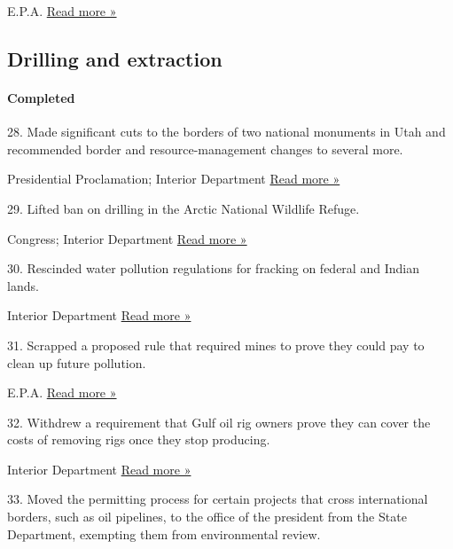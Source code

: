  E.P.A. \textbar{}
\href{https://www.agriculture.com/news/business/epa-proposal-would-shrink-buffer-zones-around-farm-pesticides}{Read
more »}

\hypertarget{drilling-and-extraction}{%
\subsection{Drilling and extraction}\label{drilling-and-extraction}}

\hypertarget{completed-1}{%
\paragraph{Completed}\label{completed-1}}

28. Made significant cuts to the borders of two national monuments in
Utah and recommended border and resource-management changes to several
more.

 Presidential Proclamation; Interior Department \textbar{}
\href{https://www.nytimes3xbfgragh.onion/2017/12/04/us/trump-bears-ears.html}{Read
more »}

29. Lifted ban on drilling in the Arctic National Wildlife Refuge.

 Congress; Interior Department \textbar{}
\href{https://www.nytimes3xbfgragh.onion/2019/08/21/us/oil-drilling-arctic.html}{Read
more »}

30. Rescinded water pollution regulations for fracking on federal and
Indian lands.

 Interior Department \textbar{}
\href{https://www.washingtonpost.com/news/energy-environment/wp/2018/01/24/california-sues-trump-administration-over-repeal-of-fracking-rule/}{Read
more »}

31. Scrapped a proposed rule that required mines to prove they could pay
to clean up future pollution.

 E.P.A. \textbar{}
\href{https://www.theguardian.com/environment/2017/dec/17/donald-trump-epa-mining-pollution-rules}{Read
more »}

32. Withdrew a requirement that Gulf oil rig owners prove they can cover
the costs of removing rigs once they stop producing.

 Interior Department \textbar{}
\href{https://www.nytimes3xbfgragh.onion/2018/03/10/business/offshore-drilling-trump-administration.html}{Read
more »}

33. Moved the permitting process for certain projects that cross
international borders, such as oil pipelines, to the office of the
president from the State Department, exempting them from environmental
review.

